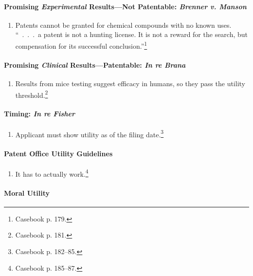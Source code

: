 \paragraph{Promising \emph{Experimental} Results---Not Patentable: 
\emph{Brenner v.  Manson}}

\begin{enumerate}
    \item Patents cannot be granted for chemical compounds with no known uses. 
    ``~.~.~.~a patent is not a hunting license. It is not a reward for the 
    search, but compensation for its successful 
    conclusion.''\footnote{Casebook p. 179.}
\end{enumerate}

\paragraph{Promising \emph{Clinical} Results---Patentable: \emph{In re Brana}}

\begin{enumerate}
    \item Results from mice testing suggest efficacy in humans, so they pass 
    the utility threshold.\footnote{Casebook p. 181.}
\end{enumerate}

\paragraph{Timing: \emph{In re Fisher}}

\begin{enumerate}
    \item Applicant must show utility as of the filing date.\footnote{Casebook 
    p. 182--85.}
\end{enumerate}

\paragraph{Patent Office Utility Guidelines}

\begin{enumerate}
    \item It has to actually work.\footnote{Casebook p. 185--87.}
\end{enumerate}

\paragraph{Moral Utility}

